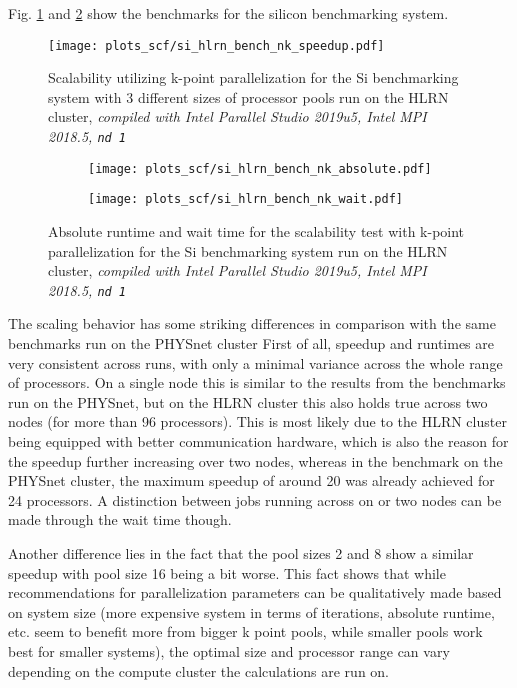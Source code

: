 \documentclass[main.tex]{subfiles}
\begin{document}
Fig. \ref{fig:scaling_scf_hlrn_nk_si_speedup} and \ref{fig:scaling_scf_hlrn_nk_si_absolute_wait} show the benchmarks for the silicon benchmarking system.
\begin{figure}[ht!]
\centering
\texttt{[image: plots\_scf/si\_hlrn\_bench\_nk\_speedup.pdf]}
\caption{Scalability utilizing k-point parallelization for the Si benchmarking system with 3 different sizes of processor pools run on the HLRN cluster, \emph{\QE compiled with Intel Parallel Studio 2019u5, Intel MPI 2018.5, \texttt{nd 1}}}
\label{fig:scaling_scf_hlrn_nk_si_speedup}
\end{figure}

\begin{figure}[ht!]
\begin{subfigure}[b]{0.49\textwidth}
    \centering
    \texttt{[image: plots\_scf/si\_hlrn\_bench\_nk\_absolute.pdf]}
\end{subfigure}
\begin{subfigure}[b]{0.49\textwidth}
    \centering
    \texttt{[image: plots\_scf/si\_hlrn\_bench\_nk\_wait.pdf]}
\end{subfigure}
\caption{Absolute runtime and wait time for the scalability test with k-point parallelization for the Si benchmarking system run on the HLRN cluster, \emph{\QE compiled with Intel Parallel Studio 2019u5, Intel MPI 2018.5, \texttt{nd 1}}}
\label{fig:scaling_scf_hlrn_nk_si_absolute_wait}
\end{figure}
The scaling behavior has some striking differences in comparison with the same benchmarks run on the PHYSnet cluster
First of all, speedup and runtimes are very consistent across runs, with only a minimal variance across the whole range of processors.
On a single node this is similar to the results from the benchmarks run on the PHYSnet, but on the HLRN cluster this also holds true across two nodes (for more than 96 processors).
This is most likely due to the HLRN cluster being equipped with better communication hardware, which is also the reason for the speedup further increasing over two nodes, whereas in the benchmark on the PHYSnet cluster, the maximum speedup of around 20 was already achieved for 24 processors.
A distinction between jobs running across on or two nodes can be made through the wait time though.

Another difference lies in the fact that the pool sizes 2 and 8 show a similar speedup with pool size 16 being a bit worse.
This fact shows that while recommendations for parallelization parameters can be qualitatively made based on system size (more expensive system in terms of iterations, absolute runtime, etc. seem to benefit more from bigger k point pools, while smaller pools work best for smaller systems), the optimal size and processor range can vary depending on the compute cluster the calculations are run on.
\end{document}
